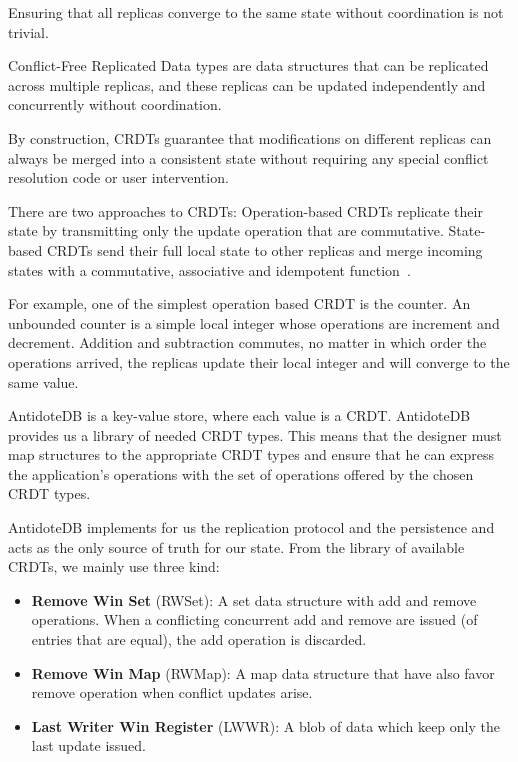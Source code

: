 \documentclass[sigconf,anonymous,10pt]{acmart}
\begin{document}
Ensuring that all replicas converge to the same state without coordination
is not trivial.

Conflict-Free Replicated Data types are data structures that
can be replicated across multiple replicas, and these replicas can be updated independently and concurrently without coordination.

By construction, CRDTs guarantee that modifications on different
replicas can always be merged into a consistent state without requiring
any special conflict resolution code or user intervention.

There are two approaches to CRDTs: Operation-based CRDTs replicate their state
by transmitting only the update operation that are commutative.
State-based CRDTs send their full local state to other replicas and merge
incoming states with a commutative, associative and idempotent function~\cite{shapiro2011conflict}.

For example, one of the simplest operation based CRDT is the counter.
An unbounded counter is a simple local integer whose operations are increment
and decrement.
Addition and subtraction commutes, no matter in which order the operations
arrived, the replicas update their local integer and will converge to the
same value.

AntidoteDB is a key-value store, where each value is a CRDT. AntidoteDB
provides us a library of needed CRDT types.
This means that the designer must map structures to the appropriate CRDT types
and ensure that he can express the application’s operations with the set
of operations offered by the chosen CRDT types.

AntidoteDB implements for us the replication protocol and the
persistence and acts as the only source of truth for our state.
From the library of available CRDTs, we mainly use three kind:

\begin{itemize}
	\item \textbf{Remove Win Set} (RWSet): A set data structure with add and
		  remove operations. When a conflicting concurrent add and remove
		  are issued (of entries that are equal), the add operation is discarded.
	\item \textbf{Remove Win Map} (RWMap): A map data structure that have also
		  favor remove operation when conflict updates arise.
	\item \textbf{Last Writer Win Register} (LWWR): A blob of data which
	keep only the last update issued.
\end{itemize}
\end{document}
